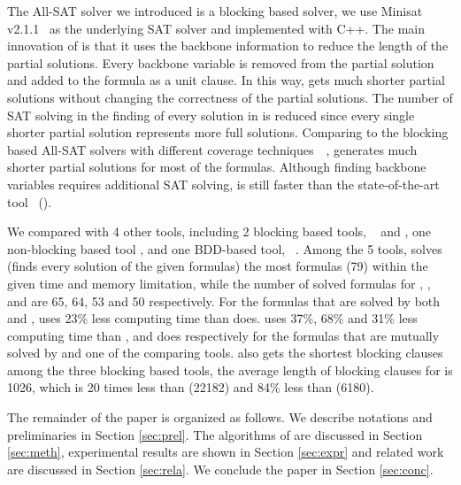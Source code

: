 The All-SAT solver \tool we introduced is a blocking based solver, we use Minisat v2.1.1~\cite{minisat} as the underlying SAT solver and implemented \tool with C++. The main innovation of \tool is that it uses the backbone information to reduce the length of the partial solutions. Every backbone variable is removed from the partial solution and added to the formula as a unit clause. In this way, \tool gets much shorter partial solutions without changing the correctness of the partial solutions. 
The number of SAT solving in the finding of every solution in \tool is reduced since every single shorter partial solution represents more full solutions. Comparing to the blocking based All-SAT solvers with different coverage techniques~\cite{jin2005efficient}~\cite{morgado2005good}, \tool generates much shorter partial solutions for most of the formulas. Although finding backbone variables requires additional SAT solving, \tool is still faster than the state-of-the-art tool~\cite{ctool} (\ctool).

We compared \tool with 4 other tools, including 2 blocking based tools, \ctool~\cite{ctool} and \bc, one non-blocking based tool , \nbc and one BDD-based tool, \bdd~\cite{ietool}. Among the 5 tools, \tool solves (finds every solution of the given formulas) the most formulas (79) within the given time and memory limitation, while the number of solved formulas for \ctool, \bc, \nbc and \bdd  are 65, 64, 53 and 50 respectively. 
For the formulas that are solved by both \tool and \ctool, \tool uses 23\% less computing time than \ctool does.
\tool uses 37\%, 68\% and 31\% less computing time than \bc, \nbc and \bdd does respectively for the formulas that are mutually solved by \tool and one of the comparing tools.
\tool also gets the shortest blocking clauses among the three blocking based tools, the average length of blocking clauses for \tool is 1026, which is 20 times less than \ctool (22182) and 84\% less than \bc (6180). 

The remainder of the paper is organized as follows. We describe notations and preliminaries in Section \ref{sec:prel}. The algorithms of \tool are discussed in Section \ref{sec:meth}, experimental results are shown in Section \ref{sec:expr} and related work are discussed in Section \ref{sec:rela}. We conclude the paper in Section \ref{sec:conc}.

